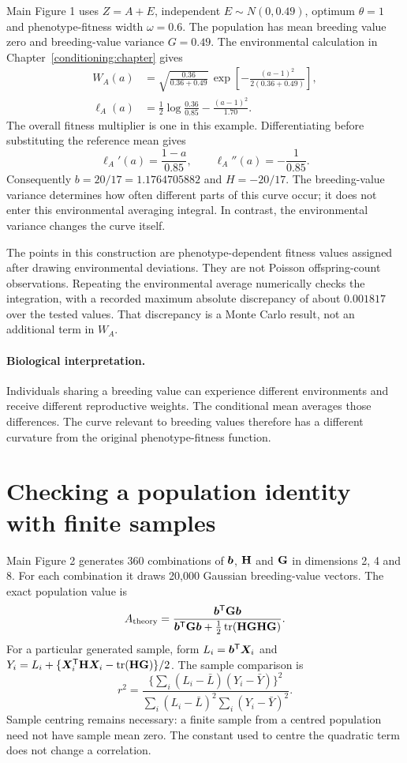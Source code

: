 Main Figure 1 uses $Z=A+E$, independent $E\sim N(0,0.49)$, optimum $\theta=1$ and phenotype-fitness width $\omega=0.6$. The population has mean breeding value zero and breeding-value variance $G=0.49$. The environmental calculation in Chapter~\ref{conditioning:chapter} gives
\begin{align}
 W_A(a)
 &=\sqrt{\frac{0.36}{0.36+0.49}}\,
    \exp\!\left[-\frac{(a-1)^2}{2(0.36+0.49)}\right],\\
 \ell_A(a)
 &=\frac12\log\frac{0.36}{0.85}-\frac{(a-1)^2}{1.70}.
\end{align}
The overall fitness multiplier is one in this example. Differentiating before substituting the reference mean gives
\[
 \ell_A'(a)=\frac{1-a}{0.85},
 \qquad
 \ell_A''(a)=-\frac{1}{0.85}.
\]
Consequently $b=20/17=1.1764705882$ and $H=-20/17$. The breeding-value variance determines how often different parts of this curve occur; it does not enter this environmental averaging integral. In contrast, the environmental variance changes the curve itself.

The points in this construction are phenotype-dependent fitness values assigned after drawing environmental deviations. They are not Poisson offspring-count observations. Repeating the environmental average numerically checks the integration, with a recorded maximum absolute discrepancy of about $0.001817$ over the tested values. That discrepancy is a Monte Carlo result, not an additional term in $W_A$.

\paragraph{Biological interpretation.}
Individuals sharing a breeding value can experience different environments and receive different reproductive weights. The conditional mean averages those differences. The curve relevant to breeding values therefore has a different curvature from the original phenotype-fitness function.

\section{Checking a population identity with finite samples}
\label{worked:main2}

Main Figure 2 generates 360 combinations of $\boldsymbol{b}$, $\mathbf{H}$ and $\mathbf{G}$ in dimensions 2, 4 and 8. For each combination it draws 20,000 Gaussian breeding-value vectors. The exact population value is
\[
 A_{\rm theory}
 =\frac{\boldsymbol{b}^{\mathsf T}\mathbf{G}\boldsymbol{b}}
 {\boldsymbol{b}^{\mathsf T}\mathbf{G}\boldsymbol{b}+
   \tfrac12\operatorname{tr}(\mathbf{H}\mathbf{G}\mathbf{H}\mathbf{G})}.
\]
For a particular generated sample, form $L_i=\boldsymbol{b}^{\mathsf T}\boldsymbol{X}_i$ and
$Y_i=L_i+\{\boldsymbol{X}_i^{\mathsf T}\mathbf{H}\boldsymbol{X}_i-\operatorname{tr}(\mathbf{H}\mathbf{G})\}/2$.
The sample comparison is
\begin{equation}
 r^2=
 \frac{\{\sum_i(L_i-\bar L)(Y_i-\bar Y)\}^2}
 {\sum_i(L_i-\bar L)^2\sum_i(Y_i-\bar Y)^2}.
 \label{worked:sample_r2}
\end{equation}
Sample centring remains necessary: a finite sample from a centred population need not have sample mean zero. The constant used to centre the quadratic term does not change a correlation.

